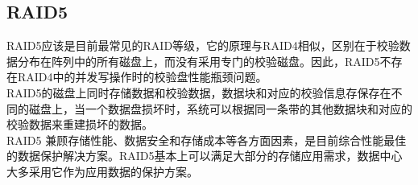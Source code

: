 \subsection{RAID5}

RAID5应该是目前最常见的RAID等级，它的原理与RAID4相似，区别在于校验数据分布在阵列中的所有磁盘上，而没有采用专门的校验磁盘。因此，RAID5不存在RAID4中的并发写操作时的校验盘性能瓶颈问题。\\

RAID5的磁盘上同时存储数据和校验数据，数据块和对应的校验信息存保存在不同的磁盘上，当一个数据盘损坏时，系统可以根据同一条带的其他数据块和对应的校验数据来重建损坏的数据。\\

RAID5 兼顾存储性能、数据安全和存储成本等各方面因素，是目前综合性能最佳的数据保护解决方案。RAID5基本上可以满足大部分的存储应用需求，数据中心大多采用它作为应用数据的保护方案。

\begin{figure}[H]
	\centering
\end{figure}

\newpage